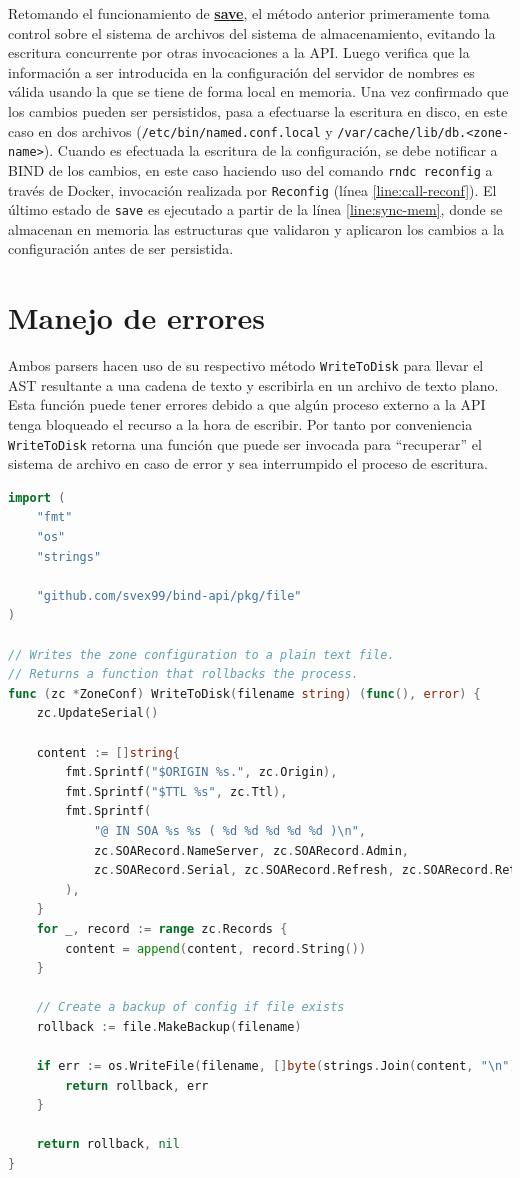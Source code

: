 Retomando el funcionamiento de \hyperref[proc:save]{\textbf{save}}, el método anterior primeramente toma control sobre el sistema de archivos del sistema de almacenamiento, evitando la escritura concurrente por otras invocaciones a la API. Luego verifica que la información a ser introducida en la configuración del servidor de nombres es válida usando la que se tiene de forma local en memoria. Una vez confirmado que los cambios pueden ser persistidos, pasa a efectuarse la escritura en disco, en este caso en dos archivos (\verb|/etc/bin/named.conf.local| y \verb|/var/cache/lib/db.<zone-name>|). Cuando es efectuada la escritura de la configuración, se debe notificar a BIND de los cambios, en este caso haciendo uso del comando \verb|rndc reconfig| a través de Docker, invocación realizada por \verb|Reconfig| (línea \ref{line:call-reconf}). El último estado de \verb|save| es ejecutado a partir de la línea \ref{line:sync-mem}, donde se almacenan en memoria las estructuras que validaron y aplicaron los cambios a la configuración antes de ser persistida.

\section{Manejo de errores}

Ambos parsers hacen uso de su respectivo método \verb|WriteToDisk| para llevar el AST resultante a una cadena de texto y escribirla en un archivo de texto plano. Esta función puede tener errores debido a que algún proceso externo a la API tenga bloqueado el recurso a la hora de escribir. Por tanto por conveniencia \verb|WriteToDisk| retorna una función que puede ser invocada para ``recuperar'' el sistema de archivo en caso de error y sea interrumpido el proceso de escritura.

\begin{lstlisting}[frame=single, language=Go, caption=Implementación de \textbf{WriteToDisk} para el AST de una zona.]
import (
    "fmt"
    "os"
    "strings"

    "github.com/svex99/bind-api/pkg/file"
)

// Writes the zone configuration to a plain text file.
// Returns a function that rollbacks the process.
func (zc *ZoneConf) WriteToDisk(filename string) (func(), error) {
	zc.UpdateSerial()

	content := []string{
		fmt.Sprintf("$ORIGIN %s.", zc.Origin),
		fmt.Sprintf("$TTL %s", zc.Ttl),
		fmt.Sprintf(
			"@ IN SOA %s %s ( %d %d %d %d %d )\n",
			zc.SOARecord.NameServer, zc.SOARecord.Admin,
			zc.SOARecord.Serial, zc.SOARecord.Refresh, zc.SOARecord.Retry, zc.SOARecord.Expire, zc.SOARecord.Minimum,
		),
	}
	for _, record := range zc.Records {
		content = append(content, record.String())
	}

    // Create a backup of config if file exists
    rollback := file.MakeBackup(filename)

    if err := os.WriteFile(filename, []byte(strings.Join(content, "\n")), 0666); err != nil {
        return rollback, err
    }

    return rollback, nil
}
\end{lstlisting}

